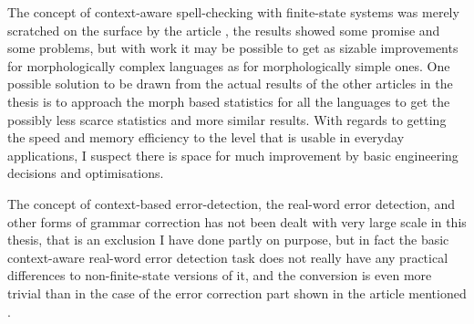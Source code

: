 \documentclass[officiallayout,draft]{unihelcompling}
\begin{document}
The concept of context-aware spell-checking with finite-state systems was
merely scratched on the surface by the article \cite{pirinen2012improving},
the results showed some promise and some problems, but with work it may be
possible to get as sizable improvements for morphologically complex languages
as for morphologically simple ones. One possible solution to be drawn from
the actual results of the other articles in the thesis is to approach the
morph based statistics for all the languages to get the possibly less scarce
statistics and more similar results. With regards to getting the speed and
memory efficiency to the level that is usable in everyday applications, I
suspect there is space for much improvement by basic engineering decisions and
optimisations.

The concept of context-based error-detection, the real-word error detection,
and other forms of grammar correction has not been dealt with very large scale
in this thesis, that is an exclusion I have done partly on purpose, but in
fact the basic context-aware real-word error detection task does not really
have any practical differences to non-finite-state versions of it, and the
conversion is even more trivial than in the case of the error correction part
shown in the article mentioned \cite{pirinen2012improving}.



\end{document}
